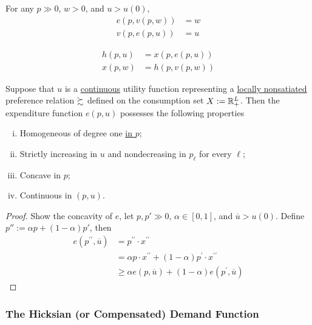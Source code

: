 \documentclass{report}
\begin{document}
 			\begin{corollary}
 				For any $p \gg 0$, $w > 0$, and $u > u(0)$,
 				\begin{align}
 					e(p, v(p, w)) &= w \\
 					v(p, e(p, u)) &= u 
 				\end{align}
 			\end{corollary}
 			
 			\begin{corollary}
 				\begin{align}
 					h(p, u) &= x(p, e(p, u)) \\
 					x(p, w) &= h(p, v(p, w))
 				\end{align}
 			\end{corollary}
 			
 			\begin{proposition}[3.E.2]
 				Suppose that $u$ is a \ul{continuous} utility function representing a \ul{locally nonsatiated} preference relation $\succsim$ defined on the consumption set $X := \mathbb{R}^L_+$. Then the expenditure function $e(p, u)$ possesses the following properties
 				\begin{enumerate}[(i)]
 					\item Homogeneous of degree one \ul{in $p$};
 					\item Strictly increasing in $u$ and nondecreasing in $p_\ell$ for every $\ell$;
 					\item Concave in $p$;
 					\item Continuous in $(p, u)$.
 				\end{enumerate}
 			\end{proposition}
 			
 			\begin{proof}
 				Show the concavity of $e$, let $p, p' \gg 0$, $\alpha \in [0, 1]$, and $\overline{u} > u(0)$. Define $p'' := \alpha p + (1-\alpha)p'$, then
 				\begin{align} 
 					e\left(p^{\prime \prime}, \overline{u}\right) &=p^{\prime \prime} \cdot x^{\prime \prime} \\
 					&=\alpha p \cdot x^{\prime \prime}+(1-\alpha) p^{\prime} \cdot x^{\prime \prime} \\ 
 					& \geq \alpha e(p, \overline{u})+(1-\alpha) e\left(p^{\prime}, \overline{u}\right) 
 				\end{align}
 			\end{proof}
 			
 			\subsubsection{The Hicksian (or Compensated) Demand Function}
 			
\end{document}

